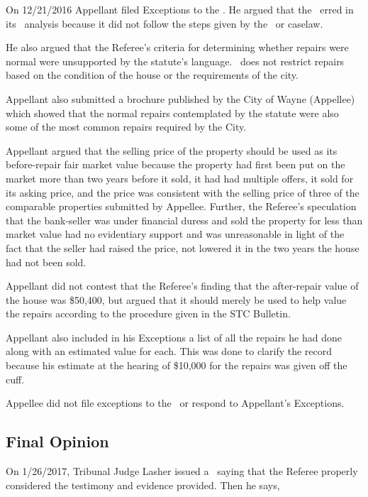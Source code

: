 \documentclass[12pt,\documentclassflag]{michiganCourtOfAppealsBrief}
\def\mathieuGast{\pincite[l]{MCL}{211.27(2)}}
\begin{document}
On 12/21/2016 Appellant filed Exceptions to the \POJ. He argued that the \POJ\ erred in its \mathieuGast\ analysis because it did not follow the steps given by the \STC\ or caselaw. 

He also argued that the Referee's criteria for determining whether repairs were normal were unsupported by the statute's language. \mathieuGast\ does not restrict repairs based on the condition of the house or the requirements of the city. 

Appellant also submitted a brochure published by the City of Wayne (Appellee) which showed that the normal repairs contemplated by the statute were also some of the most common repairs required by the City. 

Appellant argued that the selling price of the property should be used as its before-repair fair market value because the property had first been put on the market more than two years before it sold, it had had multiple offers, it sold for its asking price, and the price was consistent with the selling price of three of the comparable properties submitted by Appellee. Further, the Referee's speculation that the bank-seller was under financial duress and sold the property for less than market value had no evidentiary support and was unreasonable in light of the fact that the seller had raised the price, not lowered it in the two years the house had not been sold.

Appellant did not contest that the Referee's finding that the after-repair value of the house was \$50,400, but argued that it should merely be used to help value the repairs according to the procedure given in the STC Bulletin.

Appellant also included in his Exceptions a list of all the repairs he had done along with an estimated value for each. This was done to clarify the record because his estimate at the hearing of \$10,000 for the repairs was given off the cuff.

Appellee did not file exceptions to the \POJ\ or respond to Appellant's Exceptions.

\subsection{Final Opinion}
On 1/26/2017, Tribunal Judge Lasher issued a \FOJ\ saying that the Referee properly considered the testimony and evidence provided. Then he says,
\end{document}
